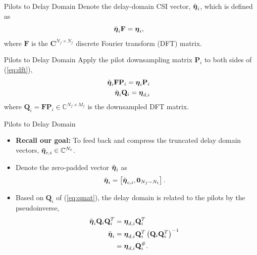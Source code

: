 \documentclass{beamer}
\begin{document}
  \begin{frame}{Pilots to Delay Domain}
    Denote the delay-domain CSI vector, $\tilde{\boldsymbol{\eta}}_i$, which is defined as
    \begin{equation}
      \tilde{\boldsymbol{\eta}}_{i}\mathbf{F} = \boldsymbol{\eta}_i, \label{eq:dft}
    \end{equation}
    where $\mathbf{F}$ is the $\mathbf{C}^{N_f \times N_f}$ discrete Fourier transform (DFT) matrix.
  \end{frame}

  \begin{frame}{Pilots to Delay Domain}
    Apply the pilot downsampling matrix $\mathbf{P}_i$ to both sides of (\ref{eq:dft}),
    \begin{align}
      \tilde{\boldsymbol{\eta}}_{i}\mathbf{F}\mathbf{P}_i = \boldsymbol{\eta}_i\mathbf{P}_i \nonumber \\
      \tilde{\boldsymbol{\eta}}_{i}\mathbf{Q}_i = \boldsymbol{\eta}_{d,i} \label{eq:qmat}
    \end{align}
    where $\mathbf{Q}_i=\mathbf{F}\mathbf{P}_i\in\mathbb{C}^{N_f\times M_f}$ is the downsampled DFT matrix.
  \end{frame}

  \begin{frame}{Pilots to Delay Domain}
    \begin{itemize}    
      \item \textbf{Recall our goal:} To feed back and compress the truncated delay domain vectors, $\tilde{\boldsymbol{\eta}}_{c,i}\in\mathbb{C}^{N_t}$.
      \item Denote the zero-padded vector $\tilde{\boldsymbol{\eta}}_{i}$ as
      \begin{align} 
        \tilde{\boldsymbol{\eta}}_{i} = \left[\tilde{\boldsymbol{\eta}}_{c,i}, \mathbf{0}_{N_f - N_t}\right]. \label{eq:p2d_short}
      \end{align}
      \item Based on $\mathbf{Q}_i$ of (\ref{eq:qmat}), the delay domain is related to the pilots by the pseudoinverse,
      \begin{align}
        \tilde{\boldsymbol{\eta}}_{i}\mathbf{Q}_i\mathbf{Q}_i^T &= \boldsymbol{\eta}_{d,i}\mathbf{Q}_i^T \nonumber \\
        \tilde{\boldsymbol{\eta}}_{i} &= \boldsymbol{\eta}_{d,i}\mathbf{Q}_i^T\left(\mathbf{Q}_i\mathbf{Q}_i^T\right)^{-1} \nonumber \\
        &= \boldsymbol{\eta}_{d,i}\mathbf{Q}_i^{\#}. \label{eq:p2d}
      \end{align}
    \end{itemize}
  \end{frame}
\end{document}
